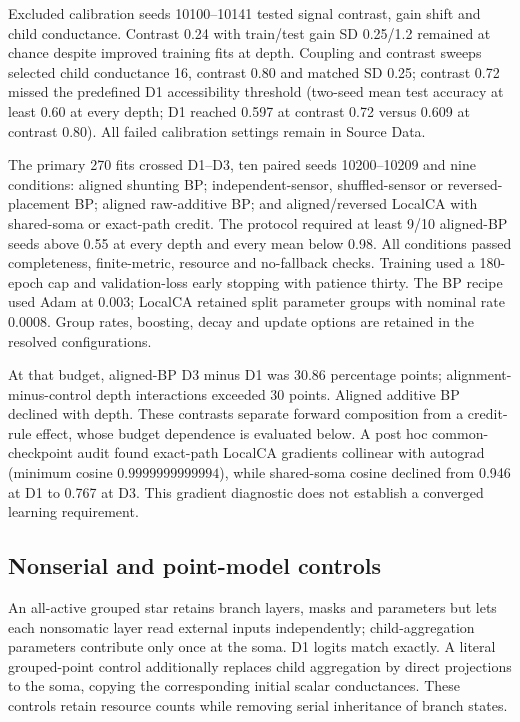 Excluded calibration seeds 10100--10141 tested signal contrast, gain shift and child conductance. Contrast 0.24 with train/test gain SD 0.25/1.2 remained at chance despite improved training fits at depth. Coupling and contrast sweeps selected child conductance 16, contrast 0.80 and matched SD 0.25; contrast 0.72 missed the predefined D1 accessibility threshold (two-seed mean test accuracy at least 0.60 at every depth; D1 reached 0.597 at contrast 0.72 versus 0.609 at contrast 0.80). All failed calibration settings remain in Source Data.

The primary 270 fits crossed D1--D3, ten paired seeds 10200--10209 and nine conditions: aligned shunting BP; independent-sensor, shuffled-sensor or reversed-placement BP; aligned raw-additive BP; and aligned/reversed LocalCA with shared-soma or exact-path credit. The protocol required at least 9/10 aligned-BP seeds above 0.55 at every depth and every mean below 0.98. All conditions passed completeness, finite-metric, resource and no-fallback checks. Training used a 180-epoch cap and validation-loss early stopping with patience thirty. The BP recipe used Adam at 0.003; LocalCA retained split parameter groups with nominal rate 0.0008. Group rates, boosting, decay and update options are retained in the resolved configurations.

At that budget, aligned-BP D3 minus D1 was 30.86 percentage points; alignment-minus-control depth interactions exceeded 30 points. Aligned additive BP declined with depth. These contrasts separate forward composition from a credit-rule effect, whose budget dependence is evaluated below. A post hoc common-checkpoint audit found exact-path LocalCA gradients collinear with autograd (minimum cosine $0.9999999999994$), while shared-soma cosine declined from 0.946 at D1 to 0.767 at D3. This gradient diagnostic does not establish a converged learning requirement.

\subsection{Nonserial and point-model controls}
An all-active grouped star retains branch layers, masks and parameters but lets each nonsomatic layer read external inputs independently; child-aggregation parameters contribute only once at the soma. D1 logits match exactly. A literal grouped-point control additionally replaces child aggregation by direct projections to the soma, copying the corresponding initial scalar conductances. These controls retain resource counts while removing serial inheritance of branch states.

